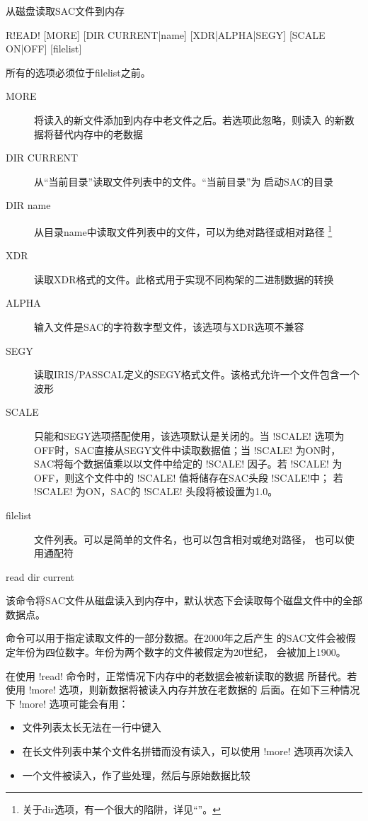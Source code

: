 \label{cmd:read}

从磁盘读取SAC文件到内存

\begin{SACSTX}
R!EAD! [MORE] [DIR CURRENT|name] [XDR|ALPHA|SEGY] [SCALE ON|OFF] [filelist]
\end{SACSTX}
所有的选项必须位于filelist之前。

\begin{description}
\item [MORE] 将读入的新文件添加到内存中老文件之后。若选项此忽略，则读入
    的新数据将替代内存中的老数据
\item [DIR CURRENT] 从``当前目录''读取文件列表中的文件。``当前目录''为
    启动SAC的目录
\item [DIR name] 从目录name中读取文件列表中的文件，可以为绝对路径或相对路径
    \footnote{关于dir选项，有一个很大的陷阱，详见``''。}
\item [XDR] 读取XDR格式的文件。此格式用于实现不同构架的二进制数据的转换
\item [ALPHA] 输入文件是SAC的字符数字型文件，该选项与XDR选项不兼容
\item [SEGY] 读取IRIS/PASSCAL定义的SEGY格式文件。该格式允许一个文件包含一个波形
\item [SCALE] 只能和SEGY选项搭配使用，该选项默认是关闭的。当 !SCALE!
    选项为OFF时，SAC直接从SEGY文件中读取数据值；当 !SCALE! 为ON时，
    SAC将每个数据值乘以以文件中给定的 !SCALE! 因子。若 !SCALE!
    为OFF，则这个文件中的 !SCALE! 值将储存在SAC头段 !SCALE!中；
    若 !SCALE! 为ON，SAC的 !SCALE! 头段将被设置为1.0。
\item [filelist] 文件列表。可以是简单的文件名，也可以包含相对或绝对路径，
    也可以使用通配符
\end{description}

\begin{SACDFT}
read dir current
\end{SACDFT}

该命令将SAC文件从磁盘读入到内存中，默认状态下会读取每个磁盘文件中的全部
数据点。

 命令可以用于指定读取文件的一部分数据。在2000年之后产生
的SAC文件会被假定年份为四位数字。年份为两个数字的文件被假定为20世纪，
会被加上1900。

在使用 !read! 命令时，正常情况下内存中的老数据会被新读取的数据
所替代。若使用 !more! 选项，则新数据将被读入内存并放在老数据的
后面。在如下三种情况下 !more! 选项可能会有用：
\begin{itemize}
\item 文件列表太长无法在一行中键入
\item 在长文件列表中某个文件名拼错而没有读入，可以使用 !more! 选项再次读入
\item 一个文件被读入，作了些处理，然后与原始数据比较
\end{itemize}

